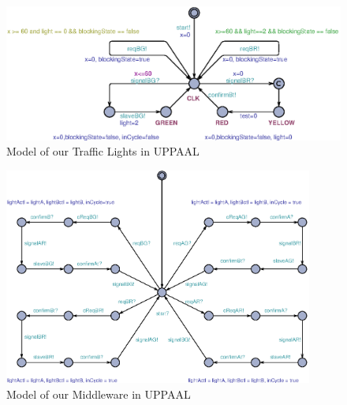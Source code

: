 \documentclass[conference]{../../setup/IEEEtran}
\begin{document}


\begin{figure}[!htb]
\centerline{\includegraphics[width=4.5in]{res/TrafficlightModel.eps}}
\caption{Model of our Traffic Lights in UPPAAL}
\label{fig:TrafficlightModel.eps}
\end{figure}

\begin{figure}[htbp]
\centering
\centerline{\includegraphics[width=4in]{res/MiddlewareModel.eps}}
\caption{Model of our Middleware in UPPAAL}
\label{fig:MiddlewareModel.eps}
\end{figure}
\end{document}
